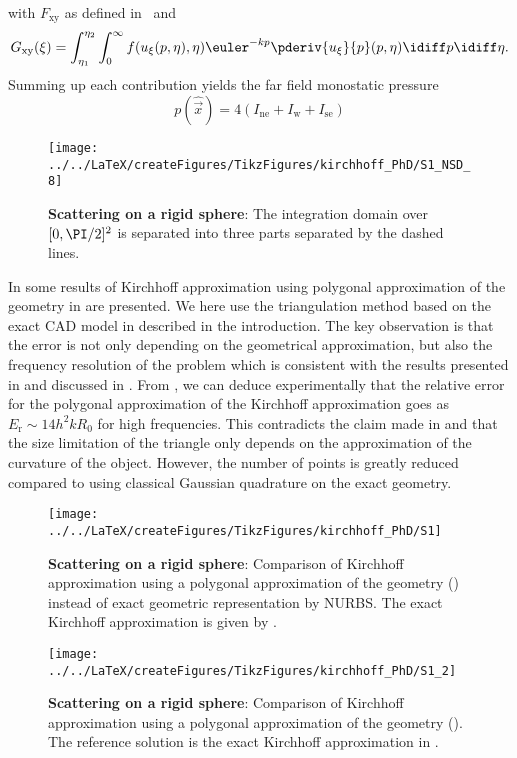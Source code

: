 with $F_{\mathrm{xy}}$ as defined in~ and 
\begin{equation*}
	G_{\mathrm{xy}}(\xi) = \int_{\eta_1}^{\eta_2}\int_0^\infty f(u_{\xi}(p,\eta),\eta)\euler^{-k p}\pderiv{u_{\xi}}{p}(p,\eta)\idiff p\idiff \eta.
\end{equation*}
Summing up each contribution yields the far field monostatic pressure
\begin{equation*}
	p(\hat{\vec{x}}) = 4(I_{\mathrm{ne}}+I_{\mathrm{w}}+I_{\mathrm{se}})
\end{equation*}
\begin{figure}
	\centering
	\texttt{[image: ../../LaTeX/createFigures/TikzFigures/kirchhoff\_PhD/S1\_NSD\_8]}
	\caption{\textbf{Scattering on a rigid sphere}: The integration domain over $[0,\PI/2]^2$ is separated into three parts separated by the dashed lines.}
	\label{Fig4:rigidSphereParmSep}
\end{figure}

In  some results of Kirchhoff approximation using polygonal approximation of the geometry in  are presented. We here use the triangulation method based on the exact CAD model in  described in the introduction. The key observation is that the error is not only depending on the geometrical approximation, but also the frequency resolution of the problem which is consistent with the results presented in \cite{Fillinger2014aen} and discussed in \cite{Gilroy2017tes}. From , we can deduce experimentally that the relative error for the polygonal approximation of the Kirchhoff approximation goes as $E_{\mathrm{r}}\sim 14h^2kR_0$ for high frequencies. This contradicts the claim made in \cite{Schneider2003asb} and \cite{Oestberg2016tes} that the size limitation of the triangle only depends on the approximation of the curvature of the object. However, the number of points is greatly reduced compared to using classical Gaussian quadrature on the exact geometry.
\begin{figure}
	\centering
	\texttt{[image: ../../LaTeX/createFigures/TikzFigures/kirchhoff\_PhD/S1]}
	\caption{\textbf{Scattering on a rigid sphere}: Comparison of Kirchhoff approximation using a polygonal approximation of the geometry () instead of exact geometric representation by NURBS. The exact Kirchhoff approximation is given by .}
	\label{Fig4:polygonApproxTS}
\end{figure}
\begin{figure}
	\centering
	\texttt{[image: ../../LaTeX/createFigures/TikzFigures/kirchhoff\_PhD/S1\_2]}
	\caption{\textbf{Scattering on a rigid sphere}: Comparison of Kirchhoff approximation using a polygonal approximation of the geometry (). The reference solution is the exact Kirchhoff approximation in .}
	\label{Fig4:polygonApproxError}
\end{figure}


